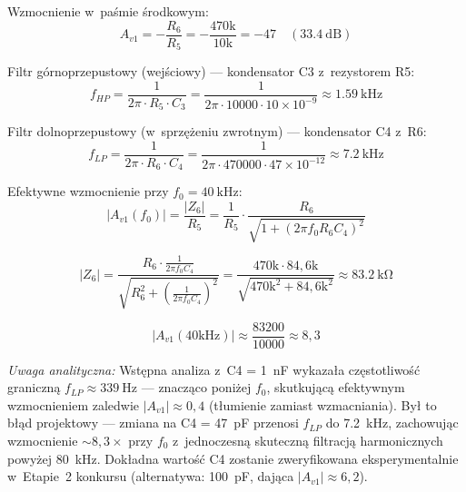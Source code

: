 \documentclass[a4paper,11pt]{article}
\begin{document}
Wzmocnienie w~paśmie środkowym:
\begin{equation}
    A_{v1} = -\frac{R_6}{R_5} = -\frac{470\text{k}}{10\text{k}} = -47 \quad (\SI{33,4}{\deci\bel})
    \label{eq:gain1}
\end{equation}

Filtr górnoprzepustowy (wejściowy) --- kondensator C3 z~rezystorem R5:
\begin{equation}
    f_{HP} = \frac{1}{2\pi \cdot R_5 \cdot C_3} = \frac{1}{2\pi \cdot 10000 \cdot 10 \times 10^{-9}} \approx \SI{1,59}{\kilo\hertz}
    \label{eq:fhp}
\end{equation}

Filtr dolnoprzepustowy (w~sprzężeniu zwrotnym) --- kondensator C4 z~R6:
\begin{equation}
    f_{LP} = \frac{1}{2\pi \cdot R_6 \cdot C_4} = \frac{1}{2\pi \cdot 470000 \cdot 47 \times 10^{-12}} \approx \SI{7,2}{\kilo\hertz}
    \label{eq:flp_raw}
\end{equation}

Efektywne wzmocnienie przy $f_0 = \SI{40}{\kilo\hertz}$:
\begin{equation}
    |A_{v1}(f_0)| = \frac{|Z_6|}{R_5} = \frac{1}{R_5} \cdot \frac{R_6}{\sqrt{1 + (2\pi f_0 R_6 C_4)^2}}
    \label{eq:gain1_f0}
\end{equation}

\begin{equation}
    |Z_6| = \frac{R_6 \cdot \frac{1}{2\pi f_0 C_4}}{\sqrt{R_6^2 + \left(\frac{1}{2\pi f_0 C_4}\right)^2}}
    = \frac{470\text{k} \cdot 84{,}6\text{k}}{\sqrt{470\text{k}^2 + 84{,}6\text{k}^2}} \approx \SI{83,2}{\kilo\ohm}
    \label{eq:z6}
\end{equation}

\begin{equation}
    |A_{v1}(40\text{kHz})| \approx \frac{83200}{10000} \approx 8{,}3
    \label{eq:gain1_actual}
\end{equation}

\textit{Uwaga analityczna:} Wstępna analiza z~C4 = \SI{1}{\nano\farad}
wykazała częstotliwość graniczną $f_{LP} \approx \SI{339}{\hertz}$ --- znacząco
poniżej $f_0$, skutkującą efektywnym wzmocnieniem zaledwie $|A_{v1}| \approx 0{,}4$
(tłumienie zamiast wzmacniania). Był to błąd projektowy --- zmiana na
C4 = \SI{47}{\pico\farad} przenosi $f_{LP}$ do \SI{7,2}{\kilo\hertz}, zachowując
wzmocnienie ${\sim}8{,}3\times$ przy $f_0$ z~jednoczesną skuteczną filtracją
harmonicznych powyżej \SI{80}{\kilo\hertz}. Dokładna wartość C4 zostanie
zweryfikowana eksperymentalnie w~Etapie~2 konkursu (alternatywa: \SI{100}{\pico\farad},
dająca $|A_{v1}| \approx 6{,}2$).
\end{document}
